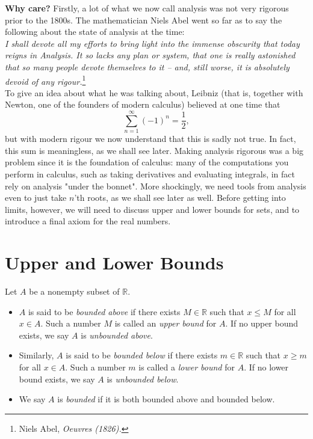 \documentclass[11pt,dvipsnames]{book}
\def\R{\mathbb{R}}
\numberwithin{equation}{section} %
\numberwithin{figure}{section} %
\numberwithin{table}{section} %
\begin{document}
\medskip
{\bf Why care?} Firstly, a lot of what we now call analysis was not very rigorous prior to the 1800s. The mathematician Niels Abel went so far as to say the following about the state of analysis at the time:\\

{\it  I shall devote all my efforts to bring light into the immense obscurity that today reigns in Analysis. It so lacks any plan or system, that one is really astonished that so many people devote themselves to it -- and, still worse, it is absolutely devoid of any rigour.}\footnote{Niels Abel, {\it Oeuvres (1826).}}\\

To give an idea about what he was talking about, Leibniz (that is, together with Newton, one of the founders of modern calculus) believed at one time that 
\[
\sum_{n=1}^{\infty} (-1)^{n} = \frac{1}{2},
\]
but with modern rigour we now understand that this is sadly not true. In fact, this sum is meaningless, as we shall see later. Making analysis rigorous was a big problem since it is the foundation of calculus:  many of the computations you perform in calculus, such as taking derivatives and evaluating integrals, in fact rely on analysis "under the bonnet". More shockingly, we need tools from analysis even to just take $n$'th roots, as we shall see later as well. Before getting into limits, however, we will need to discuss upper and lower bounds for sets, and to introduce a final axiom for the real numbers.


\section{Upper and Lower Bounds}

\def\LUB{{\rm LUB}}
\def\GLB{{\rm GLB}}
\def\ve{\varepsilon}
\def\limn{\lim_{n\rightarrow\infty}}

\def\R{\mathbb{R}}




\begin{definition}
Let $A$ be a nonempty subset of $\R$. 
\begin{itemize}
\item $A$ is said to be {\it bounded above} if
there exists $M\in\R$ such that $x\leq M$ for all $x\in A$. Such a number $M$ is called an {\it upper bound} for $A$. If no upper bound exists, we say $A$ is {\it unbounded above}.

\item Similarly, $A$ is said to be {\it bounded below} if
there exists $m\in\R$ such that $x\geq m$ for all $x\in A$. Such a number $m$ is called a {\it lower bound} for $A$. If no lower bound exists, we say $A$ is {\it unbounded below}.

\item We say $A$ is {\it bounded} if it is both bounded above and bounded below.\\
\end{itemize}
\end{definition}
\end{document}
